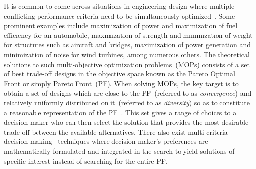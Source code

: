 \documentclass[twocolumn,10pt]{asme2ej}
\begin{document}
It is common to come across situations in engineering design where multiple conflicting performance criteria need to be simultaneously optimized~\cite{deb2001multi,Asafuddoula2015,KHTjmd2016,KHTjmd2017}. Some prominent examples include maximization of power and maximization of fuel efficiency for an automobile, maximization of strength and minimization of weight for structures such as aircraft and bridges, maximization of power generation and minimization of noise for wind turbines, among numerous others. The theoretical solutions to such multi-objective optimization problems~(MOPs) consists of a set of best trade-off designs in the objective space known as the Pareto Optimal Front or simply Pareto Front~(PF). When solving MOPs, the key target is to obtain a set of designs which are close to the PF~(referred to as \textit{convergence}) and relatively uniformly distributed on it~(referred to as \textit{diversity}) so as to constitute a reasonable representation of the PF~\cite{deb2001multi}. {\color{blue}This set gives a range of choices to a decision maker who can then select the solution that provides the most desirable trade-off between the available alternatives. There also exist multi-criteria decision making~\cite{gal2013multicriteria} techniques where decision maker's preferences are mathematically formulated and integrated in the search to yield solutions of specific interest instead of searching for the entire PF.}  
\end{document}
